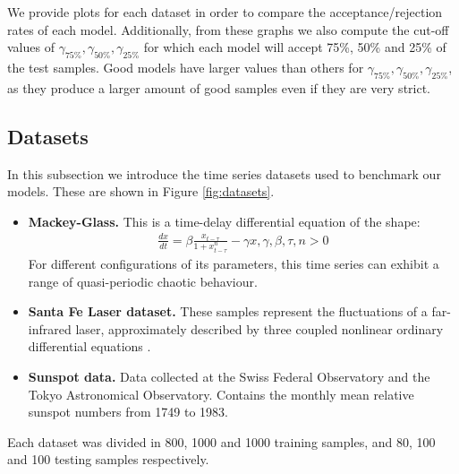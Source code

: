 \documentclass[pdftex,10pt,a4paper,journal]{article}
\theoremstyle{definition}
\theoremstyle{remark}
\begin{document}
\begin{multicols}{2}
\begin{itemize}
    \par We provide plots for each dataset in order to compare the acceptance/rejection rates of each model. Additionally, from these graphs we also compute the cut-off values of $\gamma_{75\%}, \gamma_{50\%}, \gamma_{25\%}$ for which each model will accept 75\%, 50\% and 25\% of the test samples. Good models have larger values than others for $\gamma_{75\%}, \gamma_{50\%}, \gamma_{25\%}$, as they produce a larger amount of good samples even if they are very strict.
\end{itemize}


\subsection{Datasets} \label{sub_datasets}
In this subsection we introduce the time series datasets used to benchmark our models. These are shown in Figure \ref{fig:datasets}.
\begin{itemize}
    \item\textbf{ Mackey-Glass.} This is a time-delay differential equation of the shape:
    \begin{align*}
        \frac{dx}{dt} = \beta\frac{x_{t-\tau}}{1 + x_{t-\tau}^n} - \gamma x, \gamma, \beta, \tau, n > 0
    \end{align*}
    For different configurations of its parameters, this time series can exhibit a range of quasi-periodic chaotic behaviour.
    \item \textbf{Santa Fe Laser dataset.} These samples represent the fluctuations of a far-infrared laser, approximately described by three coupled nonlinear ordinary differential equations \cite{Weigend1994}.
    \item \textbf{Sunspot data. } Data collected at the Swiss Federal Observatory and the Tokyo Astronomical Observatory. Contains the monthly mean relative sunspot numbers from 1749 to 1983. \cite{Andrews1985}
\end{itemize}
 \par Each dataset was divided in 800, 1000 and 1000 training samples, and 80, 100 and 100 testing samples respectively. 


\end{multicols}
\end{document}
